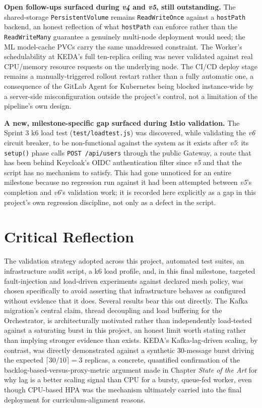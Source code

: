 \documentclass[twoside]{supsistudent}
\begin{document}
\textbf{Open follow-ups surfaced during \emph{v4} and \emph{v5}, still outstanding.} The shared-storage \texttt{PersistentVolume} remains \texttt{ReadWriteOnce} against a \texttt{hostPath} backend, an honest reflection of what \texttt{hostPath} can enforce rather than the \texttt{ReadWriteMany} guarantee a genuinely multi-node deployment would need; the ML model-cache PVCs carry the same unaddressed constraint. The Worker's schedulability at KEDA's full ten-replica ceiling was never validated against real CPU/memory resource requests on the underlying node. The CI/CD deploy stage remains a manually-triggered rollout restart rather than a fully automatic one, a consequence of the GitLab Agent for Kubernetes being blocked instance-wide by a server-side misconfiguration outside the project's control, not a limitation of the pipeline's own design.

\textbf{A new, milestone-specific gap surfaced during Istio validation.} The Sprint 3 k6 load test (\texttt{test/loadtest.js}) was discovered, while validating the \emph{v6} circuit breaker, to be non-functional against the system as it exists after \emph{v5}: its \texttt{setup()} phase calls \texttt{POST /api/users} through the public Gateway, a route that has been behind Keycloak's OIDC authentication filter since \emph{v5} and that the script has no mechanism to satisfy. This had gone unnoticed for an entire milestone because no regression run against it had been attempted between \emph{v5}'s completion and \emph{v6}'s validation work; it is recorded here explicitly as a gap in this project's own regression discipline, not only as a defect in the script.

\section{Critical Reflection}
The validation strategy adopted across this project, automated test suites, an infrastructure audit script, a k6 load profile, and, in this final milestone, targeted fault-injection and load-driven experiments against declared mesh policy, was chosen specifically to avoid asserting that infrastructure behaves as configured without evidence that it does. Several results bear this out directly. The Kafka migration's central claim, thread decoupling and load buffering for the Orchestrator, is architecturally motivated rather than independently load-tested against a saturating burst in this project, an honest limit worth stating rather than implying stronger evidence than exists. KEDA's Kafka-lag-driven scaling, by contrast, was directly demonstrated against a synthetic 30-message burst driving the expected \(\lceil 30/10 \rceil = 3\) replicas, a concrete, quantified confirmation of the backlog-based-versus-proxy-metric argument made in Chapter \emph{State of the Art} for why lag is a better scaling signal than CPU for a bursty, queue-fed worker, even though CPU-based HPA was the mechanism ultimately carried into the final deployment for curriculum-alignment reasons.
\end{document}
